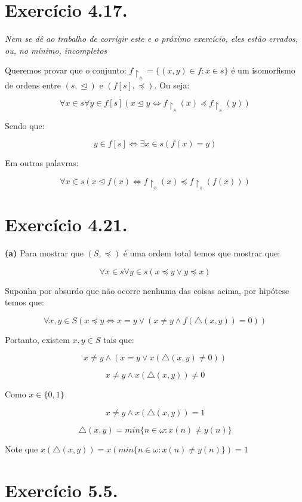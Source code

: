 \documentclass[12pt]{extarticle}
\begin{document}
\section{Exercício 4.17.}

\textit{Nem se dê ao trabalho de corrigir este e o próximo exercício, eles estão errados, ou, no mínimo, incompletos}

Queremos provar que o conjunto: $f\upharpoonright_s = \{ (x,y) \in f : x \in s\}$ é um isomorfismo de ordens entre $(s, \trianglelefteq)$ e $(f[s], \preceq)$. Ou seja:

$$
\forall x \in s \forall y \in f[s] (x \trianglelefteq y \Leftrightarrow f\upharpoonright_s(x) \preceq f\upharpoonright_s(y))
$$

Sendo que:

$$
y \in f[s] \Leftrightarrow \exists x \in s (f(x) = y)
$$

Em outras palavras:

$$
\forall x \in s (x \trianglelefteq f(x) \Leftrightarrow f\upharpoonright_s(x) \preceq f\upharpoonright_s(f(x)))
$$




\section{Exercício 4.21.}

\textbf{(a)} Para mostrar que $(S, \preceq)$ é uma ordem total temos que mostrar que:

$$
\forall x \in s \forall y \in s (x \preceq y \lor y \preceq x)
$$

Suponha por absurdo que não ocorre nenhuma das coisas acima, por hipótese temos que:

$$
\forall x, y \in S (x \preceq y \Leftrightarrow x=y \lor( x \neq y \land f(\triangle(x,y))=0))
$$

Portanto, existem $x,y \in S$ tais que:

$$
x \neq y \land (x = y \lor x(\triangle(x,y) \neq 0)) 
$$

$$
x \neq y \land x(\triangle(x,y)) \neq 0
$$

Como $x \in \{0,1\}$

$$
x \neq y \land  x(\triangle(x,y)) = 1
$$

$$
\triangle (x,y) = min \{n \in \omega : x(n) \neq y(n)\}
$$

Note que $x(\triangle(x,y)) = x(min\{n \in \omega: x(n) \neq y(n)\}) = 1$




\section{Exercício 5.5.}
\end{document}
